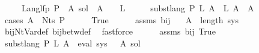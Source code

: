 \begin{isabellebody}
\ \ \ \ \ {\isachardoublequoteopen}Lang{\isacharunderscore}{\kern0pt}lfp\ P\ {\isasymle}\ {\isacharparenleft}{\kern0pt}{\isasymlambda}A{\isachardot}{\kern0pt}\ sol{\isacharprime}{\kern0pt}\ {\isacharparenleft}{\kern0pt}{\isasymgamma}{\isacharprime}{\kern0pt}\ A{\isacharparenright}{\kern0pt}{\isacharparenright}{\kern0pt}{\isachardoublequoteclose}\ {\isacharparenleft}{\kern0pt}\ {\isachardoublequoteopen}{\isacharunderscore}{\kern0pt}\ {\isasymle}\ {\isacharquery}{\kern0pt}L{\isacharprime}{\kern0pt}{\isachardoublequoteclose}{\isacharparenright}{\kern0pt}\isanewline
%
\isadelimproof
%
\endisadelimproof
%
\isatagproof
{}\isamarkupfalse%
\ {\isacharminus}{\kern0pt}\isanewline
\ \ \isamarkupfalse%
\ {\isachardoublequoteopen}subst{\isacharunderscore}{\kern0pt}lang\ P\ {\isacharquery}{\kern0pt}L{\isacharprime}{\kern0pt}\ A\ {\isasymsubseteq}\ {\isacharquery}{\kern0pt}L{\isacharprime}{\kern0pt}\ A{\isachardoublequoteclose}\ \ A\isanewline
\ \ \isamarkupfalse%
\ {\isacharparenleft}{\kern0pt}cases\ {\isachardoublequoteopen}A\ {\isasymin}\ Nts\ P{\isachardoublequoteclose}{\isacharparenright}{\kern0pt}\isanewline
\ \ \ \ \isamarkupfalse%
\ True\isanewline
\ \ \ \ \isamarkupfalse%
\ assms{\isacharparenleft}{\kern0pt}{}{\isacharparenright}{\kern0pt}\ bij{\isacharunderscore}{\kern0pt}{\isasymgamma}{\isacharunderscore}{\kern0pt}{\isasymgamma}{\isacharprime}{\kern0pt}\ \isamarkupfalse%
\ {\isachardoublequoteopen}{\isasymgamma}{\isacharprime}{\kern0pt}\ A\ {\isacharless}{\kern0pt}\ length\ sys{\isachardoublequoteclose}\isanewline
\ \ \ \ \ \ \isamarkupfalse%
\ bij{\isacharunderscore}{\kern0pt}Nt{\isacharunderscore}{\kern0pt}Var{\isacharunderscore}{\kern0pt}def\ bij{\isacharunderscore}{\kern0pt}betw{\isacharunderscore}{\kern0pt}def\ \isamarkupfalse%
\ fastforce\isanewline
\ \ \ \ \isamarkupfalse%
\ assms{\isacharparenleft}{\kern0pt}{}{\isacharparenright}{\kern0pt}\ bij{\isacharunderscore}{\kern0pt}{\isasymgamma}{\isacharunderscore}{\kern0pt}{\isasymgamma}{\isacharprime}{\kern0pt}\ True\ \isamarkupfalse%
\ {\isachardoublequoteopen}subst{\isacharunderscore}{\kern0pt}lang\ P\ {\isacharquery}{\kern0pt}L{\isacharprime}{\kern0pt}\ A\ {\isacharequal}{\kern0pt}\ eval\ {\isacharparenleft}{\kern0pt}sys\ {\isacharbang}{\kern0pt}\ {\isasymgamma}{\isacharprime}{\kern0pt}\ A{\isacharparenright}{\kern0pt}\ sol{\isacharprime}{\kern0pt}{\isachardoublequoteclose}\isanewline

\end{isabellebody}
